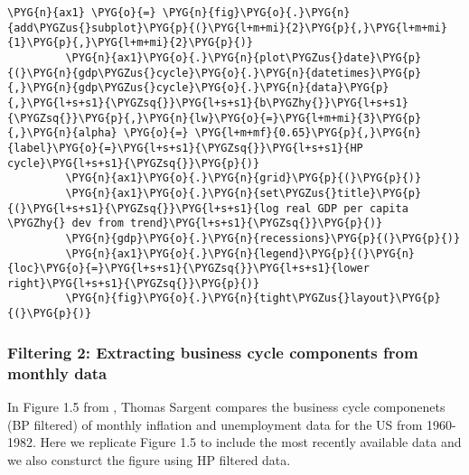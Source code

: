 \documentclass[letterpaper,10pt,openany,oneside,english]{sphinxmanual}
\begin{document}
\begin{Verbatim}[commandchars=\\\{\}]
         \PYG{n}{ax1} \PYG{o}{=} \PYG{n}{fig}\PYG{o}{.}\PYG{n}{add\PYGZus{}subplot}\PYG{p}{(}\PYG{l+m+mi}{2}\PYG{p}{,}\PYG{l+m+mi}{1}\PYG{p}{,}\PYG{l+m+mi}{2}\PYG{p}{)}
         \PYG{n}{ax1}\PYG{o}{.}\PYG{n}{plot\PYGZus{}date}\PYG{p}{(}\PYG{n}{gdp\PYGZus{}cycle}\PYG{o}{.}\PYG{n}{datetimes}\PYG{p}{,}\PYG{n}{gdp\PYGZus{}cycle}\PYG{o}{.}\PYG{n}{data}\PYG{p}{,}\PYG{l+s+s1}{\PYGZsq{}}\PYG{l+s+s1}{b\PYGZhy{}}\PYG{l+s+s1}{\PYGZsq{}}\PYG{p}{,}\PYG{n}{lw}\PYG{o}{=}\PYG{l+m+mi}{3}\PYG{p}{,}\PYG{n}{alpha} \PYG{o}{=} \PYG{l+m+mf}{0.65}\PYG{p}{,}\PYG{n}{label}\PYG{o}{=}\PYG{l+s+s1}{\PYGZsq{}}\PYG{l+s+s1}{HP cycle}\PYG{l+s+s1}{\PYGZsq{}}\PYG{p}{)}
         \PYG{n}{ax1}\PYG{o}{.}\PYG{n}{grid}\PYG{p}{(}\PYG{p}{)}
         \PYG{n}{ax1}\PYG{o}{.}\PYG{n}{set\PYGZus{}title}\PYG{p}{(}\PYG{l+s+s1}{\PYGZsq{}}\PYG{l+s+s1}{log real GDP per capita \PYGZhy{} dev from trend}\PYG{l+s+s1}{\PYGZsq{}}\PYG{p}{)}
         \PYG{n}{gdp}\PYG{o}{.}\PYG{n}{recessions}\PYG{p}{(}\PYG{p}{)}
         \PYG{n}{ax1}\PYG{o}{.}\PYG{n}{legend}\PYG{p}{(}\PYG{n}{loc}\PYG{o}{=}\PYG{l+s+s1}{\PYGZsq{}}\PYG{l+s+s1}{lower right}\PYG{l+s+s1}{\PYGZsq{}}\PYG{p}{)}
         \PYG{n}{fig}\PYG{o}{.}\PYG{n}{tight\PYGZus{}layout}\PYG{p}{(}\PYG{p}{)}
\end{Verbatim}

\noindent{}


\subsubsection{Filtering 2: Extracting business cycle components from monthly data}
\label{\detokenize{fredpy_examples:Filtering-2:-Extracting-business-cycle-components-from-monthly-data}}
In Figure 1.5 from , Thomas Sargent
compares the business cycle componenets (BP filtered) of monthly
inflation and unemployment data for the US from 1960-1982. Here we
replicate Figure 1.5 to include the most recently available data and we
also consturct the figure using HP filtered data.
\end{document}
